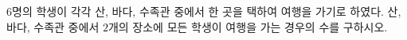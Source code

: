 \hspace*{2mm}\begin{minipage}[t]{\dimexpr\linewidth-2mm\relax}\vspace{0pt}
$6$명의 학생이 각각 산, 바다, 수족관 중에서 한 곳을 택하여 여행을 가기로 하였다. 산, 바다, 수족관 중에서 $2$개의 장소에 모든 학생이 여행을 가는 경우의 수를 구하시오.\end{minipage}
